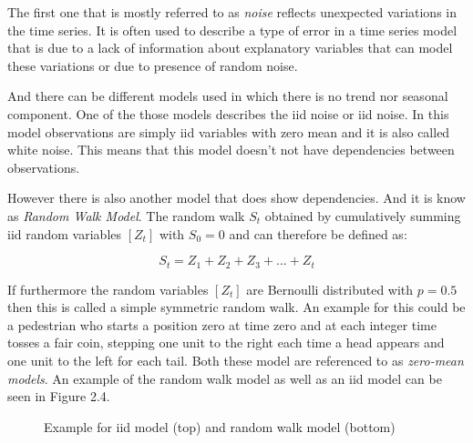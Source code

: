 The first one that is mostly referred to as \textit{noise} reflects unexpected variations in the time series. It is often used to describe a type of error in a time series model that is due to a lack of information about explanatory variables that can model these variations or due to presence of random noise.

And there can be different models used in which there is no trend nor seasonal component. One of the those models describes the \acl{iid} noise or \acs{iid} noise. In this model observations are simply \acl{iid} variables with zero mean and it is also called white noise. This means that this model doesn't not have dependencies between observations.

However there is also another model that does show dependencies. And it is know as \textit{Random Walk Model}. The random walk \(S_t \) obtained by cumulatively summing \acs{iid} random variables \([Z_t]\) with \(S_0=0\) and can therefore be defined as:

\begin{equation}\label{eq:random_walk_model}
	S_t = Z_1 + Z_2 + Z_3 + ... + Z_t
\end{equation}

If furthermore the random variables \([Z_t] \) are Bernoulli distributed with \(p=0.5\) then this is called a simple symmetric random walk. An example for this could be a pedestrian who starts a position zero at time zero and at each integer time tosses a fair coin, stepping one unit to the right each time a head appears and one unit to the left for each tail. Both these model are referenced to as \textit{zero-mean models}.
An example of the random walk model as well as an \acs{iid} model can be seen in Figure 2.4.

\begin{figure}[ht]
	\centering
	\caption{Example for iid model (top) and random walk model (bottom)}
\end{figure}

